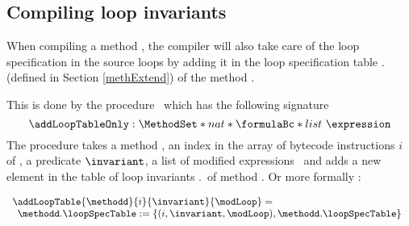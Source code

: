 \subsection{Compiling loop invariants}\label{pogEq:compile:loopInv}
When compiling a method \methodd,
the compiler will also take care of the loop specification in the source loops
by adding it in the loop specification table \methodd.\loopSpecTable (defined in Section \ref{methExtend}) of the method \methodd.

This is done by the procedure  \addLoopTableOnly \ which has the following signature
$$ \addLoopTableOnly : \MethodSet  *  nat *  \formulaBc  *  list \ \expression $$
The procedure takes a method \methodd, an index in the array of bytecode instructions $i$ of \methodd, 
a predicate $\invariant$, a list of modified expressions \modLoop \ 
and adds a new element in the table of loop invariants 
\methodd.\loopSpecTable \ of method \methodd.
 Or more formally :
 


$$ \begin{array}{l}
  \addLoopTable{\methodd}{ i }{ \invariant  }{ \modLoop} =  \\
   
   \begin{array}{l}
         
         \methodd.\loopSpecTable := \{ (i,\invariant , \modLoop  ) , \methodd.\loopSpecTable \}

   \end{array}
\end{array}$$


